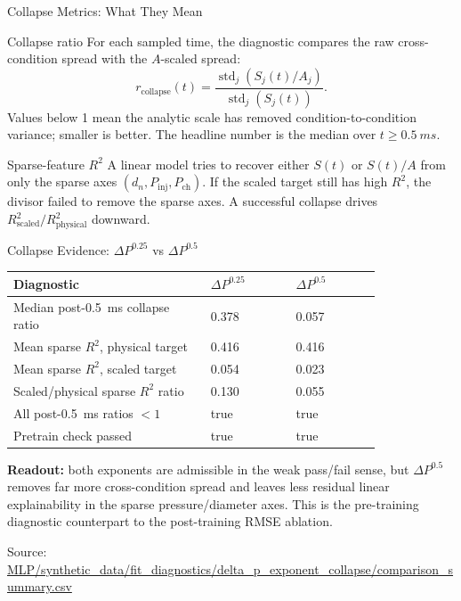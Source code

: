 \documentclass[UTF8,aspectratio=169]{ctexbeamer}
\newcommand{\good}[1]{\textcolor{green!45!black}{#1}}
\newcommand{\src}[1]{\vfill{\tiny\textcolor{gray!75!black}{Source: \url{#1}}}}
\begin{document}
\begin{frame}{Collapse Metrics: What They Mean}
\small
\begin{block}{Collapse ratio}
\footnotesize
For each sampled time, the diagnostic compares the raw cross-condition spread with the
\(A\)-scaled spread:
\[
r_{\mathrm{collapse}}(t)=
\frac{\operatorname{std}_j(S_j(t)/A_j)}{\operatorname{std}_j(S_j(t))}.
\]
Values below 1 mean the analytic scale has removed condition-to-condition variance;
smaller is better. The headline number is the median over \(t\geq\SI{0.5}{ms}\).
\end{block}

\begin{block}{Sparse-feature \(R^2\)}
\footnotesize
A linear model tries to recover either \(S(t)\) or \(S(t)/A\) from only the sparse
axes \((d_n,P_{\mathrm{inj}},P_{\mathrm{ch}})\). If the scaled target still has high
\(R^2\), the divisor failed to remove the sparse axes. A successful collapse drives
\(R^2_{\mathrm{scaled}}/R^2_{\mathrm{physical}}\) downward.
\end{block}
\end{frame}

\begin{frame}{Collapse Evidence: \(\Delta P^{0.25}\) vs \(\Delta P^{0.5}\)}
\small
\begin{center}
\begin{tabular}{L{0.44\linewidth}R{0.19\linewidth}R{0.19\linewidth}}
\toprule
Diagnostic & \(\Delta P^{0.25}\) & \(\Delta P^{0.5}\) \\
\midrule
Median post-\SI{0.5}{ms} collapse ratio & 0.378 & \good{0.057} \\
Mean sparse \(R^2\), physical target & 0.416 & 0.416 \\
Mean sparse \(R^2\), scaled target & 0.054 & \good{0.023} \\
Scaled/physical sparse \(R^2\) ratio & 0.130 & \good{0.055} \\
All post-\SI{0.5}{ms} ratios \(<1\) & true & true \\
Pretrain check passed & true & true \\
\bottomrule
\end{tabular}
\end{center}

\vspace{0.35em}
\footnotesize
\textbf{Readout:} both exponents are admissible in the weak pass/fail sense, but
\(\Delta P^{0.5}\) removes far more cross-condition spread and leaves less residual
linear explainability in the sparse pressure/diameter axes. This is the pre-training
diagnostic counterpart to the post-training RMSE ablation.

\src{MLP/synthetic_data/fit_diagnostics/delta_p_exponent_collapse/comparison_summary.csv}
\end{frame}
\end{document}
